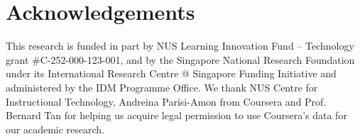 \documentclass[11pt,a4paper]{article}
\begin{document}
\section*{Acknowledgements}
This research is funded in part by NUS Learning Innovation Fund --
Technology grant \#C-252-000-123-001, and by the Singapore National
Research Foundation under its International Research Centre @
Singapore Funding Initiative and administered by the IDM Programme
Office. We thank NUS Centre for Instructional Technology, Andreina Parisi-Amon 
from Coursera and Prof. Bernard Tan for helping us acquire legal 
permission to use Coursera's data for our academic research. 



\end{document}
